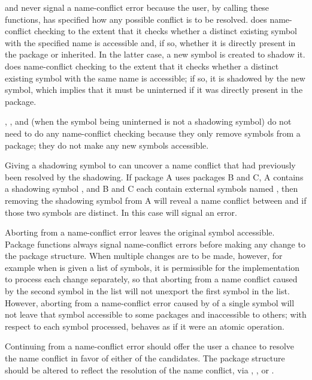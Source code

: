  and  never signal a name-conflict error
because the user, by calling these functions, has specified how any
possible conflict is to be resolved.   does name-conflict
checking to the extent that it checks whether a distinct existing symbol with
the specified name is accessible and, if so, whether it is directly
present in the package or inherited.  In the latter case, a new symbol
is created to shadow it.   does name-conflict
checking to the extent that it checks whether a distinct existing
symbol with the same name is accessible; if so, it is shadowed by
the new symbol, which implies that it must be uninterned
if it was directly present in the package.

, , and  (when the symbol being
uninterned is not a shadowing symbol) do not need to do any
name-conflict checking because they only remove symbols from a package;
they do not make any new symbols accessible.

Giving a shadowing symbol to  can uncover a name conflict that had
previously been resolved by the shadowing.  If package A uses packages
B and C, A contains a shadowing symbol , and B and C each contain external
symbols named , then removing the shadowing symbol 
from A will reveal a name
conflict between  and  if those two symbols are distinct.
In this case  will signal an error.

Aborting from a name-conflict error leaves the original symbol accessible.
Package functions always signal name-conflict errors before making any
change to the package structure.  When multiple changes are to be made,
however, for example when  is given a list of symbols, it is
permissible for the implementation to process each change separately,
so that aborting from a name
conflict caused by the second symbol in the list will not unexport the
first symbol in the list.  However, aborting from a name-conflict error
caused by  of a single symbol will not leave that symbol accessible
to some packages and inaccessible to others; with respect to
each symbol processed, 
behaves as if it were an atomic operation.

Continuing from a name-conflict error should offer the user a chance to
resolve the name conflict in favor of either of the candidates.  The
package structure should be altered to reflect the resolution of the
name conflict, via , , or .

